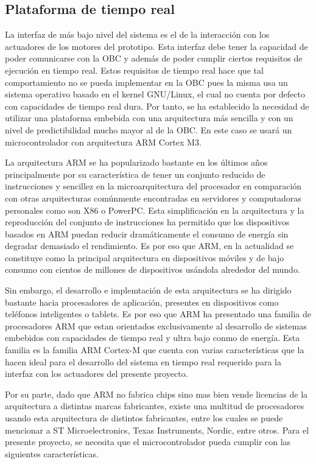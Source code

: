     \subsection{Plataforma de tiempo real}
    La interfaz de más bajo nivel del sistema es el de la interacción con los actuadores de los motores del prototipo. Esta 
    interfaz debe tener la capacidad de poder comunicarse con la OBC y además de poder cumplir ciertos requisitos de ejecución 
    en tiempo real. Estos requisitos de tiempo real hace que tal comportamiento no se pueda implementar en la OBC pues la misma 
    usa un sistema operativo basado en el kernel GNU/Linux, el cual no cuenta por defecto con capacidades de tiempo real dura. 
    Por tanto, se ha establecido la necesidad de utilizar una plataforma embebida con una arquitectura más sencilla y con un 
    nivel de predictibilidad mucho mayor al de la OBC. En este caso se usará un microcontrolador con arquitectura ARM Cortex M3.

    La arquitectura ARM se ha popularizado bastante en los últimos años principalmente por su característica de tener un conjunto 
    reducido de instrucciones y sencillez en la microarquitectura del procesador en comparación con otras arquitecturas comúnmente 
    encontradas en servidores y computadoras personales como son X86 o PowerPC. Esta simplificación en la arquitectura y la reproducción
    del conjunto de instrucciones ha permitido que los dispositivos basados en ARM puedan reducir dramáticamente el consumo de 
    energía sin degradar demasiado el rendimiento. Es por eso que ARM, en la actualidad se constituye como la principal arquitectura en 
    dispositivos móviles y de bajo consumo con cientos de millones de dispositivos usándola alrededor del mundo.

    Sin embargo, el desarrollo e implemtación de esta arquitectura se ha dirigido bastante hacia procesadores de aplicación, presentes
    en dispositivos como teléfonos inteligentes o tablets. Es por eso que ARM ha presentado una familia de procesadores ARM que estan
    orientados exclusivamente al desarrollo de sistemas embebidos con capacidades de tiempo real y ultra bajo conmo de energía. Esta 
    familia es la familia ARM Cortex-M que cuenta con varias características que la hacen ideal para el desarrollo del sistema en tiempo 
    real requerido para la interfaz con los actuadores del presente proyecto.

    Por su parte, dado que ARM no fabrica chips sino mas bien vende licencias de la arquitectura a distintas marcas fabricantes, existe 
    una multitud de procesadores usando esta arquitectura de distintos fabricantes, entre los cuales se puede mencionar a ST Microelectronics,
    Texas Instruments, Nordic, entre otros. Para el presente proyecto, se necesita que el microcontrolador pueda cumplir con las 
    siguientes características. 

